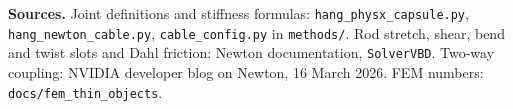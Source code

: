 \documentclass[10pt,a4paper]{article}
\begin{document}
\vspace{4pt}
{\footnotesize \textbf{Sources.} Joint definitions and stiffness formulas:
\texttt{hang\_physx\_capsule.py}, \texttt{hang\_newton\_cable.py}, \texttt{cable\_config.py} in \texttt{methods/}.
Rod stretch, shear, bend and twist slots and Dahl friction: Newton documentation, \texttt{SolverVBD}.
Two-way coupling: NVIDIA developer blog on Newton, 16 March 2026.
FEM numbers: \texttt{docs/fem\_thin\_objects}.}
\end{document}
